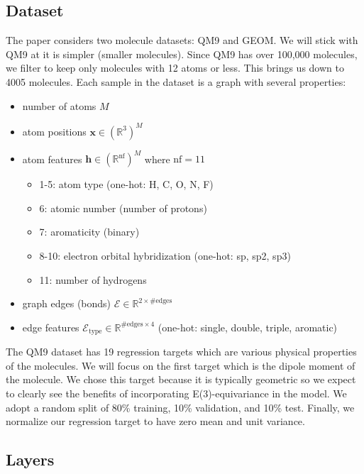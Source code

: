 \documentclass[sigconf]{acmart}
\begin{document}
\subsection{Dataset}
The paper considers two molecule datasets: QM9 and GEOM. We will stick with QM9 at it is simpler (smaller molecules). Since QM9 has over 100,000 molecules, we filter to keep only molecules with 12 atoms or less. This brings us down to 4005 molecules.
Each sample in the dataset is a graph with several properties:
\begin{itemize}
    \item number of atoms $M$
    \item atom positions $\mathbf{x} \in (\mathbb{R}^3)^M$
    \item atom features $\mathbf{h} \in (\mathbb{R}^\text{nf})^M$ where $\text{nf} = 11$
    \begin{itemize}
        \item 1-5: atom type (one-hot: H, C, O, N, F)
        \item 6: atomic number (number of protons)
        \item 7: aromaticity (binary)
        \item 8-10: electron orbital hybridization (one-hot: sp, sp2, sp3)
        \item 11: number of hydrogens
    \end{itemize}
    \item graph edges (bonds) $\mathcal{E} \in \mathbb{R}^{2\times\text{\#edges}}$
    \item edge features $\mathcal{E}_\text{type} \in \mathbb{R}^{\text{\#edges}\times 4}$ (one-hot: single, double, triple, aromatic)
\end{itemize}

The QM9 dataset has 19 regression targets which are various physical properties of the molecules.
We will focus on the first target which is the dipole moment of the molecule. We chose this target because it is typically geometric so we expect to clearly see the benefits of 
incorporating E(3)-equivariance in the model.
We adopt a random split of 80\% training, 10\% validation, and 10\% test.
Finally, we normalize our regression target to have zero mean and unit variance.

\subsection{Layers}
\end{document}
